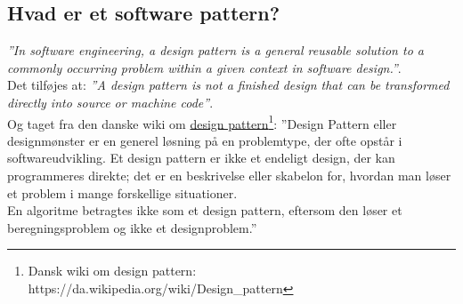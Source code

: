 \subsection{Hvad er et software pattern?}
\textit{''In software engineering, a design pattern is a general reusable solution to a commonly occurring problem within a given context in software design.''}.\\

Det tilføjes at: 
\textit{''A design pattern is not a finished design that can be transformed directly into source or machine code''}.\\

Og taget fra den danske wiki om \href{https://da.wikipedia.org/wiki/Design_pattern}{design pattern\footnote{Dansk wiki om design pattern:\\  \url{https://da.wikipedia.org/wiki/Design_pattern}}}:
''Design Pattern eller designmønster er en generel løsning på en problemtype, der ofte opstår i softwareudvikling. Et design pattern er ikke et endeligt design, der kan programmeres direkte; det er en beskrivelse eller skabelon for, hvordan man løser et problem i mange forskellige situationer.\\

En algoritme betragtes ikke som et design pattern, eftersom den løser et beregningsproblem og ikke et designproblem.''
